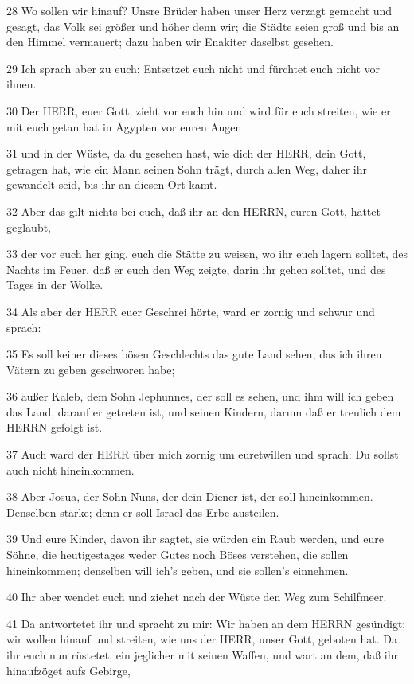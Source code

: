 \par 28 Wo sollen wir hinauf? Unsre Brüder haben unser Herz verzagt gemacht und gesagt, das Volk sei größer und höher denn wir; die Städte seien groß und bis an den Himmel vermauert; dazu haben wir Enakiter daselbst gesehen.
\par 29 Ich sprach aber zu euch: Entsetzet euch nicht und fürchtet euch nicht vor ihnen.
\par 30 Der HERR, euer Gott, zieht vor euch hin und wird für euch streiten, wie er mit euch getan hat in Ägypten vor euren Augen
\par 31 und in der Wüste, da du gesehen hast, wie dich der HERR, dein Gott, getragen hat, wie ein Mann seinen Sohn trägt, durch allen Weg, daher ihr gewandelt seid, bis ihr an diesen Ort kamt.
\par 32 Aber das gilt nichts bei euch, daß ihr an den HERRN, euren Gott, hättet geglaubt,
\par 33 der vor euch her ging, euch die Stätte zu weisen, wo ihr euch lagern solltet, des Nachts im Feuer, daß er euch den Weg zeigte, darin ihr gehen solltet, und des Tages in der Wolke.
\par 34 Als aber der HERR euer Geschrei hörte, ward er zornig und schwur und sprach:
\par 35 Es soll keiner dieses bösen Geschlechts das gute Land sehen, das ich ihren Vätern zu geben geschworen habe;
\par 36 außer Kaleb, dem Sohn Jephunnes, der soll es sehen, und ihm will ich geben das Land, darauf er getreten ist, und seinen Kindern, darum daß er treulich dem HERRN gefolgt ist.
\par 37 Auch ward der HERR über mich zornig um euretwillen und sprach: Du sollst auch nicht hineinkommen.
\par 38 Aber Josua, der Sohn Nuns, der dein Diener ist, der soll hineinkommen. Denselben stärke; denn er soll Israel das Erbe austeilen.
\par 39 Und eure Kinder, davon ihr sagtet, sie würden ein Raub werden, und eure Söhne, die heutigestages weder Gutes noch Böses verstehen, die sollen hineinkommen; denselben will ich's geben, und sie sollen's einnehmen.
\par 40 Ihr aber wendet euch und ziehet nach der Wüste den Weg zum Schilfmeer.
\par 41 Da antwortetet ihr und spracht zu mir: Wir haben an dem HERRN gesündigt; wir wollen hinauf und streiten, wie uns der HERR, unser Gott, geboten hat. Da ihr euch nun rüstetet, ein jeglicher mit seinen Waffen, und wart an dem, daß ihr hinaufzöget aufs Gebirge,
